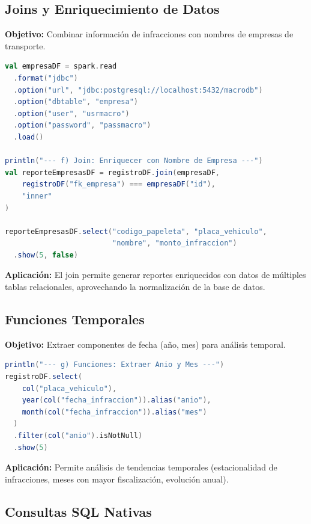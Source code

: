 \documentclass[12pt,a4paper]{article}
\begin{document}
\subsection{Joins y Enriquecimiento de Datos}

\textbf{Objetivo:} Combinar información de infracciones con nombres de empresas de transporte.

\begin{lstlisting}[language=Scala, caption={Join entre registro\_infraccion y empresa}]
val empresaDF = spark.read
  .format("jdbc")
  .option("url", "jdbc:postgresql://localhost:5432/macrodb")
  .option("dbtable", "empresa")
  .option("user", "usrmacro")
  .option("password", "passmacro") 
  .load()

println("--- f) Join: Enriquecer con Nombre de Empresa ---")
val reporteEmpresasDF = registroDF.join(empresaDF, 
    registroDF("fk_empresa") === empresaDF("id"), 
    "inner"
)

reporteEmpresasDF.select("codigo_papeleta", "placa_vehiculo", 
                         "nombre", "monto_infraccion")
  .show(5, false)
\end{lstlisting}

\textbf{Aplicación:} El join permite generar reportes enriquecidos con datos de múltiples tablas relacionales, aprovechando la normalización de la base de datos.

\subsection{Funciones Temporales}

\textbf{Objetivo:} Extraer componentes de fecha (año, mes) para análisis temporal.

\begin{lstlisting}[language=Scala, caption={Extracción de año y mes}]
println("--- g) Funciones: Extraer Anio y Mes ---")
registroDF.select(
    col("placa_vehiculo"),
    year(col("fecha_infraccion")).alias("anio"),
    month(col("fecha_infraccion")).alias("mes")
  )
  .filter(col("anio").isNotNull)
  .show(5)
\end{lstlisting}

\textbf{Aplicación:} Permite análisis de tendencias temporales (estacionalidad de infracciones, meses con mayor fiscalización, evolución anual).

\subsection{Consultas SQL Nativas}
\end{document}
